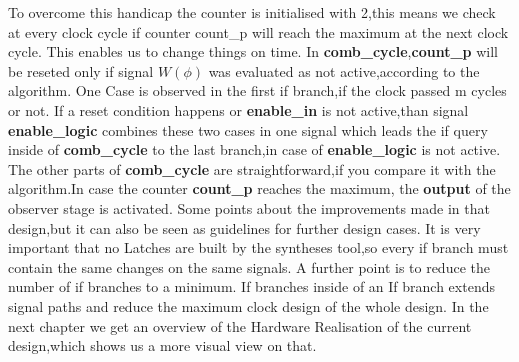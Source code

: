 To overcome this handicap the counter is initialised with 2,this means we check at every clock cycle if counter count\_p will reach the maximum
at the next clock cycle. This enables us to change things on time. 
In \textbf{comb\_cycle},\textbf{count\_p} will be reseted only if signal $W(\phi)$ was evaluated as not active,according to the algorithm.
One Case is observed in the first if branch,if the clock passed m cycles or not. If a reset condition happens or \textbf{enable\_in}
is not active,than signal \textbf{enable\_logic} combines these two cases in one signal which leads the if query inside of \textbf{comb\_cycle} to the last branch,in case of \textbf{enable\_logic}
is not active. The other parts of \textbf{comb\_cycle} are straightforward,if you compare it with the algorithm.In case the counter \textbf{count\_p} reaches the maximum,
the  \textbf{output} of the observer stage is activated.\newline
Some points about the improvements made in that design,but it can also be seen as guidelines for further design cases.
It is very important that no Latches are built by the syntheses tool,so every if branch must contain the same changes on the same signals.
A further point is to reduce the number of if branches to a minimum. If branches inside of an If branch extends signal paths and reduce the maximum clock design of the whole design.
\newline
In the next chapter we get an overview of the Hardware Realisation of the current design,which shows us a more visual view on that.
